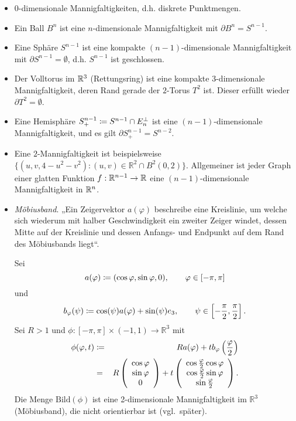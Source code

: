 \documentclass[a4paper,twoside,DIV15,BCOR12mm]{scrbook}
\begin{document}
 \begin{itemize}
\item $0$-dimensionale Mannigfaltigkeiten, d.h. diskrete Punktmengen.
\item Ein Ball $B^{n}$ ist eine $n$-dimensionale Mannigfaltigkeit mit $\partial 
B^{n} = S^{n-1}$.
\item Eine Sphäre $S^{n-1}$ ist eine kompakte $(n-1)$-dimensionale Mannigfaltigkeit
 mit $\partial S^{n-1} = \emptyset$, d.h. $S^{n-1}$ ist geschlossen.
\item Der Volltorus im $\mathbb{R}^3$ (Rettungsring) ist eine kompakte $3$-dimensionale Mannigfaltigkeit, 
deren Rand gerade der $2$-Torus $T^2$ ist. Dieser erfüllt wieder $\partial T^2=\emptyset$.
\item Eine Hemisphäre $S^{n-1}_{+}\da S^{n-1}\cap E_n^\perp$ ist eine 
$(n-1)$-dimensionale Mannigfaltigkeit, und es gilt  $\partial S_{+}^{n-1} = 
S^{n-2}$.
\item Eine $2$-Mannigfaltigkeit ist beispielsweise  
 $\{(u,v,4 - u^{2} - v^{2}): (u,v) \in 
{\mathbb R}^{2} \cap B^{2}(0,2)\}$. Allgemeiner ist jeder Graph einer 
glatten Funktion $f:\mathbb{R}^{n-1}\to\mathbb{R}$ eine $(n-1)$-dimensionale Mannigfaltigkeit in $\mathbb{R}^n$.
\item {\em Möbiusband}. %
„Ein Zeigervektor $a(\varphi)$ beschreibe 
eine Kreislinie, um welche sich wiederum mit halber Geschwindigkeit 
ein zweiter Zeiger windet, dessen Mitte auf der Kreislinie und 
dessen Anfangs- und Endpunkt auf dem Rand des Möbiusbands liegt“.

Sei
\[ a(\varphi) \da  (\cos \varphi, \sin \varphi, 0), \qquad \varphi 
\in [-\pi,\pi] \]
und
\[ b_{\varphi}(\psi) \da  \cos (\psi) a(\varphi)  + \sin( \psi) e_{3} , 
\qquad \psi \in \left[ -\frac{\pi}{2}, \frac{\pi}{2}\right]. \]
Sei $R > 1$ und $\phi: [-\pi, \pi] \times (-1,1) \to {\mathbb R}^{3}$ 
mit
\begin{eqnarray*}
\phi(\varphi,t) & \da  & Ra(\varphi) + t b_{\varphi} 
\left(\frac{\varphi}{2}\right) \\
& = & R \left(\begin{array}{c} \cos \varphi \\ \sin \varphi \\ 0 
\end{array} \right) + t \left( \begin{array}{c} \cos 
\frac{\varphi}{2} \cos \varphi \\ \cos \frac{\varphi}{2} \sin \varphi 
\\ \sin \frac{\varphi}{2} \end{array} \right).
\end{eqnarray*}
Die Menge $\text{Bild}(\phi)$ ist eine 2-dimensionale Mannigfaltigkeit im 
${\mathbb R}^{3}$ (Möbiusband), die nicht orientierbar ist (vgl.\ später).
\end{itemize}
\end{document}
